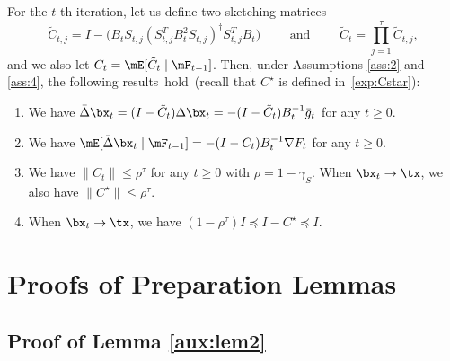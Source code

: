 \begin{lemma}\label{aux:lem4}
For the $t$-th iteration, let us define two sketching matrices
\begin{equation}\label{appen:A1:equ6}
\tilde{C}_{t,j} = I-\big(B_tS_{t,j}(S_{t,j}^TB_t^2S_{t,j})^{\dagger}S_{t,j}^TB_t\big)\quad\quad \text{ and }\quad\quad \tilde{C}_t = \prod_{j=1}^\tau \tilde{C}_{t,j},
\end{equation}
and we also let $C_t =\mE[\tilde{C}_t\mid \mF_{t-1}]$. Then, under Assumptions \ref{ass:2} and \ref{ass:4}, the following \mbox{results}~hold~(recall that $C^\star$ is defined in~\eqref{exp:Cstar}):
\begin{enumerate}[label=(\alph*)]
\item We have $\bar{\Delta}\bx_t=(I-\tilde{C}_t)\Delta\bx_t=-(I-\tilde{C}_t)B_t^{-1}\bar{g}_t$ for any $ t\geq 0$.
\item We have $\mE[\bar{\Delta}\bx_t\mid\mF_{t-1}]=-(I-C_t)B_t^{-1}\nabla F_t$ for any $t\geq 0$.
\item We have $\|C_t\|\leq \rho^\tau$ for any $t\geq 0$ with $\rho=1-\gamma_S$. When $\bx_t\rightarrow\tx$, we also have $\|C^\star\|\leq\rho^\tau$.
\item When $\bx_t\rightarrow\tx$, we have $(1-\rho^\tau)I\preceq I-C^\star \preceq I$.
\end{enumerate}
	
\end{lemma}


\section{Proofs of Preparation Lemmas}

\subsection{Proof of Lemma \ref{aux:lem2}}

